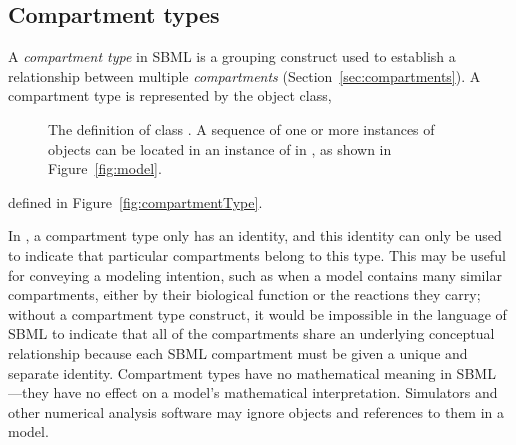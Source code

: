 \subsection{Compartment types}
\label{sec:compartmentType}

A \emph{compartment type} in SBML is a grouping construct used to
establish a relationship between multiple \emph{compartments}
(Section~\ref{sec:compartments}).  A compartment type is
represented by the \CompartmentType object class, 
\begin{figure}
  \centering
  \small
  \caption{The definition of class \CompartmentType.  A
      sequence of one or more instances of \CompartmentType
      objects can be located in an instance of
      \ListOfCompartmentTypes in \Model, as shown in
      Figure~\protect\ref{fig:model}.}
  \label{fig:compartmentType}
\end{figure}
defined in Figure~\vref{fig:compartmentType}.

In \sbmltwothree {}, a compartment type only has an
identity, and this identity can only be used to indicate that
particular compartments belong to this type.  This may be useful
for conveying a modeling intention, such as when a model contains
many similar compartments, either by their biological function or
the reactions they carry; without a compartment type construct, it
would be impossible in the language of SBML to indicate that all
of the compartments share an underlying conceptual relationship
because each SBML compartment must be given a unique and separate
identity.  Compartment types have no mathematical meaning in
SBML \thisLV---they have no effect on a model's
mathematical interpretation.  Simulators and other numerical
analysis software may ignore \CompartmentType objects and
references to them in a model.


